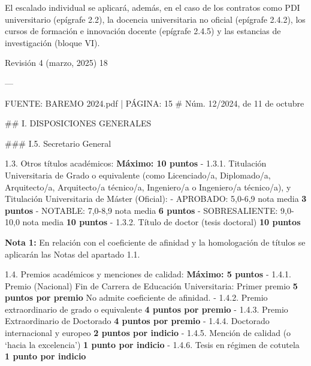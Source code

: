 \documentclass{article}
\begin{document}
\begin{itemize}
\begin{itemize}
\begin{scriptsize}
                  El escalado individual se aplicará, además, en el caso de los contratos como PDI universitario (epígrafe 2.2), la docencia universitaria no oficial (epígrafe 2.4.2), los cursos de formación e innovación docente (epígrafe 2.4.5) y las estancias de investigación (bloque VI).

                  Revisión 4 (marzo, 2025) 18

                  ---

                  FUENTE: BAREMO 2024.pdf | PÁGINA: 15
                  \# Núm. 12/2024, de 11 de octubre

                  \#\# I. DISPOSICIONES GENERALES

                  \#\#\# I.5. Secretario General

                  1.3. Otros títulos académicos:                                                            \textbf{Máximo: 10 puntos}
                  - 1.3.1. Titulación Universitaria de Grado o equivalente (como Licenciado/a, Diplomado/a, Arquitecto/a, Arquitecto/a técnico/a, Ingeniero/a o Ingeniero/a técnico/a), y Titulación Universitaria de Máster (Oficial):
                  - APROBADO: 5,0-6,9 nota media                            \textbf{3 puntos}
                  - NOTABLE: 7,0-8,9 nota media                             \textbf{6 puntos}
                  - SOBRESALIENTE: 9,0-10,0 nota media                      \textbf{10 puntos}
                  - 1.3.2. Título de doctor (tesis doctoral)                  \textbf{10 puntos}

                  \textbf{Nota 1:} En relación con el coeficiente de afinidad y la homologación de títulos se aplicarán las Notas del apartado 1.1.

                  1.4. Premios académicos y menciones de calidad:                                           \textbf{Máximo: 5 puntos}
                  - 1.4.1. Premio (Nacional) Fin de Carrera de Educación Universitaria: Primer premio           \textbf{5 puntos por premio}           No admite coeficiente de afinidad.
                  - 1.4.2. Premio extraordinario de grado o equivalente        \textbf{4 puntos por premio}
                  - 1.4.3. Premio Extraordinario de Doctorado                  \textbf{4 puntos por premio}
                  - 1.4.4. Doctorado internacional y europeo                   \textbf{2 puntos por indicio}
                  - 1.4.5. Mención de calidad (o ‘hacia la excelencia’)        \textbf{1 punto por indicio}
                  - 1.4.6. Tesis en régimen de cotutela                        \textbf{1 punto por indicio}


\end{scriptsize}
\end{itemize}
\end{itemize}
\end{document}
